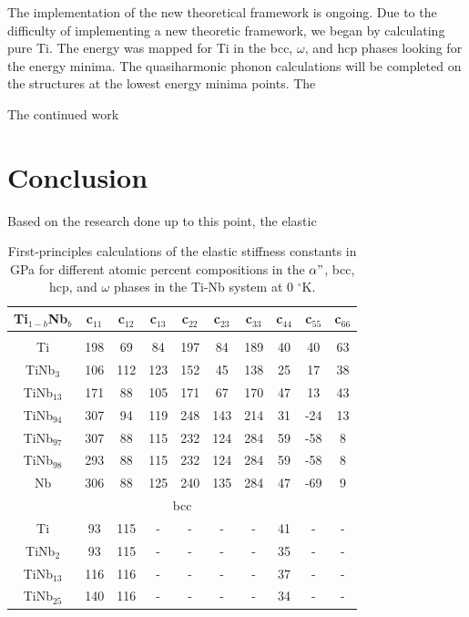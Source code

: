The implementation of the new theoretical framework is ongoing. Due to the difficulty of implementing a new theoretic framework, we began by calculating pure Ti. The energy was mapped for Ti in the bcc, $\omega$, and hcp phases looking for the energy minima. The quasiharmonic phonon calculations will be completed on the structures at the lowest energy minima points. The 

The continued work 

\section{Conclusion}

Based on the research done up to this point, the elastic 

\newpage
\begin{longtable}[H]{ c c c c c c c c c c }
	\caption{First-principles calculations of the elastic stiffness constants in GPa for different atomic percent compositions in the $\alpha"$, bcc, hcp, and $\omega$  phases in the Ti-Nb system at 0 $^\circ$K.} 	\label{Ch7-table:tinbdata} \\
	\hline
	Ti$_{1-b}$Nb$_b$ & c$_{11}$ & c$_{12}$ & c$_{13}$ & c$_{22}$ & c$_{23}$ & c$_{33}$ & c$_{44}$ & c$_{55}$ & c$_{66}$\\
	\hline
	\endhead
	\hline
	\endfoot
	\multicolumn{10}{c}{$\alpha"$}\\
	\hline
	Ti & 198 & 69 & 84 & 197 & 84 & 189 & 40 & 40 & 63 \\		
	TiNb$_{3}$ & 106 & 112 & 123 & 152 & 45 & 138 & 25 & 17 & 38 \\
	TiNb$_{13}$ & 171 & 88 & 105 & 171 & 67 & 170 & 47 & 13 & 43 \\
	TiNb$_{94}$ & 307 & 94 & 119 & 248 & 143 & 214 & 31 & -24 & 13 \\
	TiNb$_{97}$ & 307 & 88 & 115 & 232 & 124 & 284 & 59 & -58 & 8 \\
	TiNb$_{98}$ & 293 & 88 & 115 & 232 & 124 & 284 & 59 & -58 & 8 \\
	Nb & 306 & 88 & 125 & 240 & 135 & 284 & 47 & -69 & 9 \\
	\hline
	\multicolumn{10}{c}{bcc}\\
	\hline
	Ti & 93 & 115 & - & - & - & - & 41 & - & - \\		
	TiNb$_{2}$ & 93 & 115 & - & - & - & - & 35 & - & - \\
	TiNb$_{13}$ & 116 & 116 & - & - & - & - & 37 & - & - \\
	TiNb$_{25}$ & 140 & 116 & - & - & - & - & 34 & - & - \\

\end{longtable}
